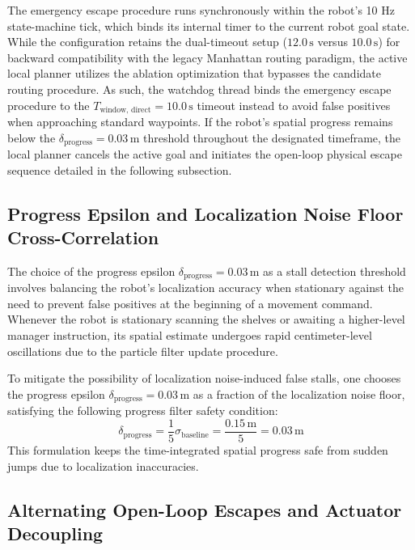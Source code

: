 The emergency escape procedure runs synchronously within the robot's 10 Hz state-machine tick, which binds its internal timer to the current robot goal state. While the configuration retains the dual-timeout setup ($12.0\,\text{s}$ versus $10.0\,\text{s}$) for backward compatibility with the legacy Manhattan routing paradigm, the active local planner utilizes the ablation optimization that bypasses the candidate routing procedure. As such, the watchdog thread binds the emergency escape procedure to the $T_{\text{window, direct}} = 10.0\,\text{s}$ timeout instead to avoid false positives when approaching standard waypoints. If the robot's spatial progress remains below the $\delta_{\text{progress}} = 0.03\,\text{m}$ threshold throughout the designated timeframe, the local planner cancels the active goal and initiates the open-loop physical escape sequence detailed in the following subsection.

\subsection{Progress Epsilon and Localization Noise Floor Cross-Correlation}

The choice of the progress epsilon $\delta_{\text{progress}} = 0.03\,\text{m}$ as a stall detection threshold involves balancing the robot's localization accuracy when stationary against the need to prevent false positives at the beginning of a movement command. Whenever the robot is stationary scanning the shelves or awaiting a higher-level manager instruction, its spatial estimate undergoes rapid centimeter-level oscillations due to the particle filter update procedure.

To mitigate the possibility of localization noise-induced false stalls, one chooses the progress epsilon $\delta_{\text{progress}} = 0.03\,\text{m}$ as a fraction of the localization noise floor, satisfying the following progress filter safety condition:
\begin{equation} \delta_{\text{progress}} = \frac{1}{5} \sigma_{\text{baseline}} = \frac{0.15\,\text{m}}{5} = 0.03\,\text{m} \label{eq:epsilon_noise_separation} \end{equation}
This formulation keeps the time-integrated spatial progress safe from sudden jumps due to localization inaccuracies.

\subsection{Alternating Open-Loop Escapes and Actuator Decoupling}

